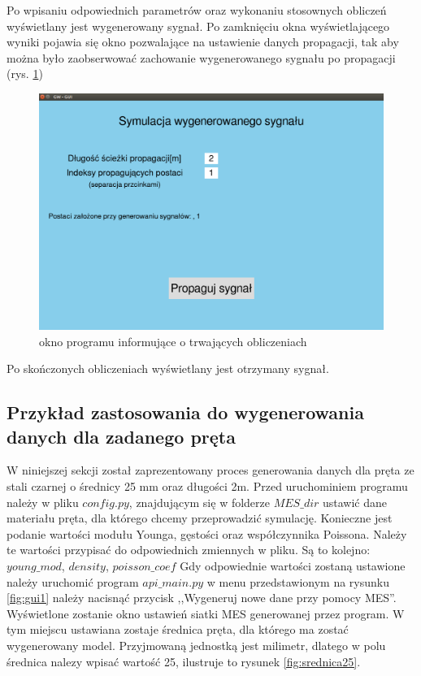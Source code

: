 Po wpisaniu odpowiednich parametrów oraz wykonaniu stosownych obliczeń wyświetlany jest wygenerowany sygnał. Po zamknięciu okna wyświetlającego wyniki pojawia się  okno pozwalające na ustawienie danych propagacji, tak aby można było zaobserwować zachowanie wygenerowanego sygnału po propagacji (rys. \ref{fig:guiLast2})

\begin{figure}[h]
\centering
\includegraphics[width=13cm]{Zdjecia/5/kasia/guiLast2}
\caption{okno programu informujące o trwających obliczeniach}
\label{fig:guiLast2}
\end{figure}

Po skończonych obliczeniach wyświetlany jest otrzymany sygnał.

\subsection{Przykład zastosowania do wygenerowania danych dla zadanego pręta}

W niniejszej sekcji został zaprezentowany proces generowania danych dla pręta ze stali czarnej o średnicy 25 mm oraz długości 2m. Przed uruchominiem programu należy w pliku $config.py$, znajdującym się w folderze $MES\_dir$ ustawić dane materiału pręta, dla którego chcemy przeprowadzić symulację. Konieczne jest podanie wartości modułu Younga, gęstości oraz współczynnika Poissona. Należy te wartości przypisać do odpowiednich zmiennych w pliku. Są to kolejno: $young\_mod$, $density$, $poisson\_coef$ Gdy odpowiednie wartości zostaną ustawione należy uruchomić program $api\_main.py$ w menu przedstawionym na rysunku \ref{fig:gui1} należy nacisnąć przycisk ,,Wygeneruj nowe dane przy pomocy MES''. Wyświetlone zostanie okno ustawień siatki MES generowanej przez program. W tym miejscu  ustawiana zostaje średnica pręta, dla którego ma zostać wygenerowany model. Przyjmowaną jednostką jest milimetr, dlatego w polu średnica nalezy wpisać wartość 25, ilustruje to rysunek \ref{fig:srednica25}.


